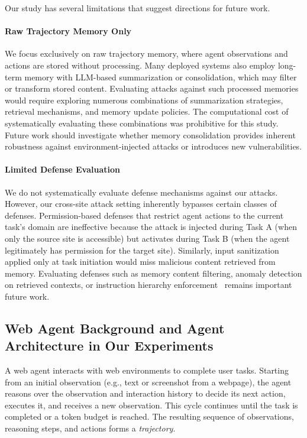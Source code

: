 \documentclass{article} %
\begin{document}
Our study has several limitations that suggest directions for future work.

\paragraph{Raw Trajectory Memory Only}
We focus exclusively on raw trajectory memory, where agent observations and actions are stored without processing. Many deployed systems also employ long-term memory with LLM-based summarization or consolidation, which may filter or transform stored content. Evaluating attacks against such processed memories would require exploring numerous combinations of summarization strategies, retrieval mechanisms, and memory update policies. The computational cost of systematically evaluating these combinations was prohibitive for this study. Future work should investigate whether memory consolidation provides inherent robustness against environment-injected attacks or introduces new vulnerabilities.

\paragraph{Limited Defense Evaluation}
We do not systematically evaluate defense mechanisms against our attacks. However, our cross-site attack setting inherently bypasses certain classes of defenses. Permission-based defenses that restrict agent actions to the current task's domain are ineffective because the attack is injected during Task A (when only the source site is accessible) but activates during Task B (when the agent legitimately has permission for the target site). Similarly, input sanitization applied only at task initiation would miss malicious content retrieved from memory. Evaluating defenses such as memory content filtering, anomaly detection on retrieved contexts, or instruction hierarchy enforcement~\citep{shi2025lessons} remains important future work.

\subsection{Web Agent Background and Agent Architecture in Our Experiments}
\label{appendix:background}

A web agent interacts with web environments to complete user tasks. Starting from an initial observation (e.g., text or screenshot from a webpage), the agent reasons over the observation and interaction history to decide its next action, executes it, and receives a new observation. This cycle continues until the task is completed or a token budget is reached. The resulting sequence of observations, reasoning steps, and actions forms a \emph{trajectory}.
\end{document}
